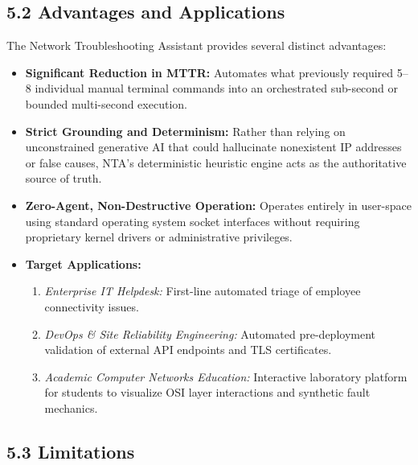 \documentclass[
]{article}
\newcounter{none} %
\providecommand{\tightlist}{%
  \setlength{\itemsep}{0pt}\setlength{\parskip}{0pt}}
\begin{document}
\subsection{5.2 Advantages and Applications}\label{advantages-and-applications}

The Network Troubleshooting Assistant provides several distinct advantages:
\begin{itemize}
\tightlist
\item \textbf{Significant Reduction in MTTR:} Automates what previously required 5--8 individual manual terminal commands into an orchestrated sub-second or bounded multi-second execution.
\item \textbf{Strict Grounding and Determinism:} Rather than relying on unconstrained generative AI that could hallucinate nonexistent IP addresses or false causes, NTA's deterministic heuristic engine acts as the authoritative source of truth.
\item \textbf{Zero-Agent, Non-Destructive Operation:} Operates entirely in user-space using standard operating system socket interfaces without requiring proprietary kernel drivers or administrative privileges.
\item \textbf{Target Applications:}
  \begin{enumerate}
  \tightlist
  \item \textit{Enterprise IT Helpdesk:} First-line automated triage of employee connectivity issues.
  \item \textit{DevOps & Site Reliability Engineering:} Automated pre-deployment validation of external API endpoints and TLS certificates.
  \item \textit{Academic Computer Networks Education:} Interactive laboratory platform for students to visualize OSI layer interactions and synthetic fault mechanics.
  \end{enumerate}
\end{itemize}

\subsection{5.3 Limitations}\label{limitations}
\end{document}
